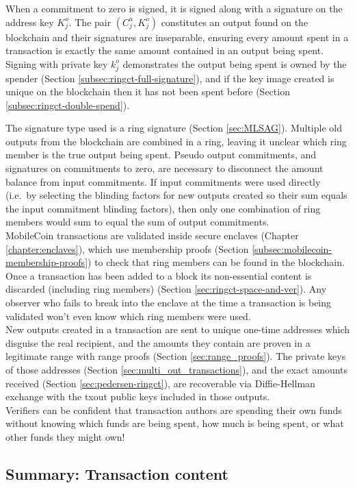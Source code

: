 When a commitment to zero is signed, it is signed along with a signature on the address key $K^o_j$. The pair $(C^a_j, K^o_j)$ constitutes an output found on the blockchain and their signatures are inseparable, ensuring every amount spent in a transaction is exactly the same amount contained in an output being spent. Signing with private key $k^o_j$ demonstrates the output being spent is owned by the spender (Section \ref{subsec:ringct-full-signature}), and if the key image created is unique on the blockchain then it has not been spent before (Section \ref{subsec:ringct-double-spend}).

The signature type used is a ring signature (Section \ref{sec:MLSAG}). Multiple old outputs from the blockchain are combined in a ring, leaving it unclear which ring member is the true output being spent. Pseudo output commitments, and signatures on commitments to zero, are necessary to disconnect the amount balance from input commitments. If input commitments were used directly (i.e.\ by selecting the blinding factors for new outputs created so their sum equals the input commitment blinding factors), then only one combination of ring members would sum to equal the sum of output commitments.\\

MobileCoin transactions are validated inside secure enclaves (Chapter \ref{chapter:enclaves}), which use membership proofs (Section \ref{subsec:mobilecoin-membership-proofs}) to check that ring members can be found in the blockchain. Once a transaction has been added to a block its non-essential content is discarded (including ring members) (Section \ref{sec:ringct-space-and-ver}). Any observer who fails to break into the enclave at the time a transaction is being validated won't even know which ring members were used.\\

New outputs created in a transaction are sent to unique one-time addresses which disguise the real recipient, and the amounts they contain are proven in a legitimate range with range proofs (Section \ref{sec:range_proofs}). The private keys of those addresses (Section \ref{sec:multi_out_transactions}), and the exact amounts received (Section \ref{sec:pedersen-ringct}), are recoverable via Diffie-Hellman exchange with the txout public keys included in those outputs.\\

Verifiers can be confident that transaction authors are spending their own funds without knowing which funds are being spent, how much is being spent, or what other funds they might own!


\newpage
\subsection{Summary: Transaction content}
\label{subsec:ringct-tx-content-summary}
\fi

